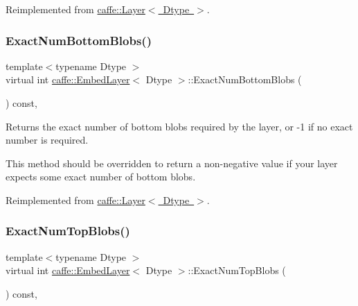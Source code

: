 Reimplemented from \mbox{\hyperlink{classcaffe_1_1_layer_a8e5ee0494d85f5f55fc4396537cbc60f}{caffe\+::\+Layer$<$ Dtype $>$}}.

\mbox{\label{classcaffe_1_1_embed_layer_a0634500a12e1d2299b7c8556976e4529}} 
\subsubsection{\texorpdfstring{Exact\+Num\+Bottom\+Blobs()}{ExactNumBottomBlobs()}\hspace{0.1cm}{\footnotesize\ttfamily [2/2]}}
{\footnotesize\ttfamily template$<$typename Dtype $>$ \\
virtual int \mbox{\hyperlink{classcaffe_1_1_embed_layer}{caffe\+::\+Embed\+Layer}}$<$ Dtype $>$\+::Exact\+Num\+Bottom\+Blobs (\begin{DoxyParamCaption}{ }\end{DoxyParamCaption}) const\hspace{0.3cm}{\ttfamily [inline]}, {\ttfamily [virtual]}}



Returns the exact number of bottom blobs required by the layer, or -\/1 if no exact number is required. 

This method should be overridden to return a non-\/negative value if your layer expects some exact number of bottom blobs. 

Reimplemented from \mbox{\hyperlink{classcaffe_1_1_layer_a8e5ee0494d85f5f55fc4396537cbc60f}{caffe\+::\+Layer$<$ Dtype $>$}}.

\mbox{\label{classcaffe_1_1_embed_layer_af02f4561fa25a979e523aae851bed39d}} 
\subsubsection{\texorpdfstring{Exact\+Num\+Top\+Blobs()}{ExactNumTopBlobs()}\hspace{0.1cm}{\footnotesize\ttfamily [1/2]}}
{\footnotesize\ttfamily template$<$typename Dtype $>$ \\
virtual int \mbox{\hyperlink{classcaffe_1_1_embed_layer}{caffe\+::\+Embed\+Layer}}$<$ Dtype $>$\+::Exact\+Num\+Top\+Blobs (\begin{DoxyParamCaption}{ }\end{DoxyParamCaption}) const\hspace{0.3cm}{\ttfamily [inline]}, {\ttfamily [virtual]}}



